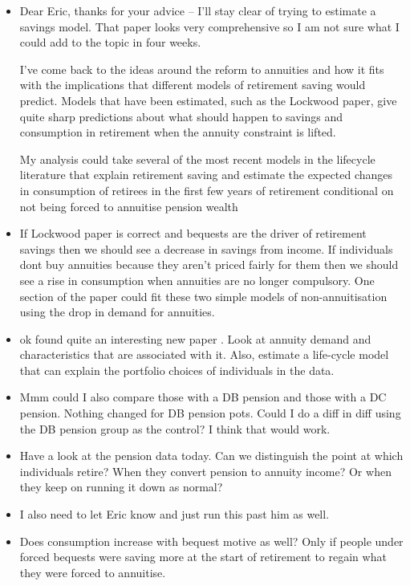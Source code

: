 \documentclass[12pt]{article}
\begin{document}
\begin{itemize}
      \item Dear Eric, thanks for your advice -- I'll stay clear of trying to estimate a savings model. That paper looks
            very comprehensive so I am not sure what I could add to the topic in four weeks.

            I've come back to the ideas around the reform to annuities and how it fits with the implications that different models
            of retirement saving would predict. Models that have been estimated, such as the Lockwood paper, give quite sharp
            predictions about what should happen to savings and consumption in retirement when the annuity constraint is lifted.

            My analysis could take several of the most recent models in the lifecycle literature that explain retirement saving
            and estimate the expected changes in consumption of retirees in the first few years of retirement conditional on not
            being forced to annuitise pension wealth

      \item If Lockwood paper is correct and bequests are the driver of retirement savings then we should see a decrease in savings
            from income. If individuals dont buy annuities because they aren't priced fairly for them then we should see a rise in consumption
            when annuities are no longer compulsory. One section of the paper could fit these two simple models of non-annuitisation using
            the drop in demand for annuities.


      \item ok found quite an interesting new paper \cite{inkman_et_al_rfs_2011}. Look
            at annuity demand and characteristics that are associated with it. Also,
            estimate a life-cycle model that can explain the portfolio choices
            of individuals in the data.

      \item Mmm could I also compare those with a DB pension and those with a DC pension.
            Nothing changed for DB pension pots. Could I do a diff in diff using the DB pension group
            as the control? I think that would work.

      \item Have a look at the pension data today. Can we distinguish the point at which individuals retire?
            When they convert pension to annuity income? Or when they keep on running it down as normal?

      \item I also need to let Eric know and just run this past him as well.


      \item Does consumption increase with bequest motive as well? Only if people under forced bequests were
            saving more at the start of retirement to regain what they were forced to annuitise.


\end{itemize}
\end{document}
